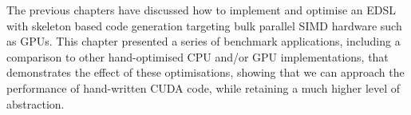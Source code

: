 The previous chapters have discussed how to implement and optimise an EDSL with
skeleton based code generation targeting bulk parallel SIMD hardware such as
GPUs. This chapter presented a series of benchmark applications, including a
comparison to other hand-optimised CPU and/or GPU implementations, that
demonstrates the effect of these optimisations, showing that we can approach the
performance of hand-written CUDA code, while retaining a much higher level of
abstraction.



%

